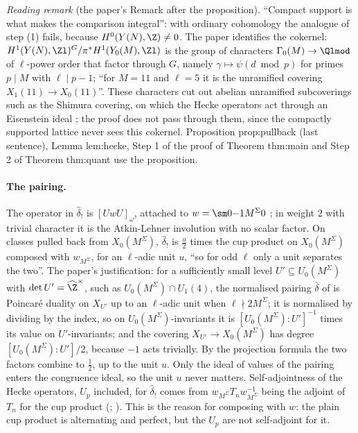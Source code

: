\begin{sloppypar}
\emph{Reading remark} (the paper's Remark after the proposition). ``Compact support is what makes the comparison integral'': with ordinary cohomology the analogue
of step (1) fails, because $H^0(Y(N),\Z)\ne0$. The paper identifies the cokernel: $H^1(Y(N),\Zl)^G/\pi^*H^1(Y_0(M),\Zl)$ is the group of characters $\Gamma_0(M)\to\Qlmod$ of $\ell$-power order that
factor through $G$, namely $\gamma\mapsto\psi(d\bmod p)$ for primes $p\mid M$ with $\ell\mid p-1$; ``for $M=11$ and $\ell=5$ it is the unramified covering $X_1(11)\to X_0(11)$''. These
characters cut out abelian unramified subcoverings such as the Shimura covering, on which the Hecke operators act through an Eisenstein ideal
\cite{LingOesterle,Ribet88}; the proof does not pass through them, since the compactly supported lattice never sees this cokernel. Proposition prop:pullback (last
sentence), Lemma lem:hecke, Step 1 of the proof of Theorem thm:main and Step 2 of Theorem thm:quant use the proposition.

\paragraph{The pairing.} The operator in $\hat\delta_!$ is $[UwU]_\omega$, attached to $w=\sm0{-1}{M^\Sigma}0$ \cite[Section 1.5.3, (13), (14)]{DFG04}; in weight $2$ with
trivial character it is the Atkin-Lehner involution with no scalar factor. On classes pulled back from $X_0(M^\Sigma)$, $\hat\delta_!$ is $\frac u2$ times the cup product
on $X_0(M^\Sigma)$ composed with $w_{M^\Sigma}$, for an $\ell$-adic unit $u$, ``so for odd $\ell$ only a unit separates the two''. The paper's justification: for a sufficiently small
level $U'\subseteq U_0(M^\Sigma)$ with $\det U'=\widehat\Z^\times$, such as $U_0(M^\Sigma)\cap U_1(4)$, the normalised pairing $\bar\delta$ of \cite[Section 1.5.2]{DFG04} is Poincar\'e duality on $X_{U'}$
up to an $\ell$-adic unit when $\ell\nmid2M^\Sigma$; it is normalised by dividing by the index, so on $U_0(M^\Sigma)$-invariants it is $[U_0(M^\Sigma):U']^{-1}$ times its value on
$U'$-invariants; and the covering $X_{U'}\to X_0(M^\Sigma)$ has degree $[U_0(M^\Sigma):U']/2$, because $-1$ acts trivially. By the projection formula the two factors combine to $\frac12$,
up to the unit $u$. Only the ideal of values of the pairing enters the congruence ideal, so the unit $u$ never matters. Self-adjointness of the Hecke operators, $U_p$ included, for $\hat\delta_!$ comes from
$w_{M^\Sigma}T_nw_{M^\Sigma}^{-1}$ being the adjoint of $T_n$ for the cup product (\cite[Section 1.8.2, (25)]{DFG04}; ). This is the reason for composing with $w$: the
plain cup product is alternating and perfect, but the $U_p$ are not self-adjoint for it.


\end{sloppypar}
